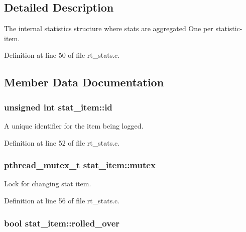 \subsection{Detailed Description}
The internal statistics structure where stats are aggregated One per statistic-\/item. 

Definition at line 50 of file rt\-\_\-stats.\-c.



\subsection{Member Data Documentation}
\hypertarget{structstat__item_a8f48ef423c6bb652d59e567f3585f6bd}{
\subsubsection[{id}]{\setlength{\rightskip}{0pt plus 5cm}unsigned int stat\-\_\-item\-::id}}\label{structstat__item_a8f48ef423c6bb652d59e567f3585f6bd}


A unique identifier for the item being logged. 



Definition at line 52 of file rt\-\_\-stats.\-c.

\hypertarget{structstat__item_a5dc6d221657bec60e0613ef64ea6ee28}{
\subsubsection[{mutex}]{\setlength{\rightskip}{0pt plus 5cm}pthread\-\_\-mutex\-\_\-t stat\-\_\-item\-::mutex}}\label{structstat__item_a5dc6d221657bec60e0613ef64ea6ee28}


Lock for changing stat item. 



Definition at line 56 of file rt\-\_\-stats.\-c.

\hypertarget{structstat__item_ac8339e9dc15d83bd0e8a4de598427b56}{
\subsubsection[{rolled\-\_\-over}]{\setlength{\rightskip}{0pt plus 5cm}bool stat\-\_\-item\-::rolled\-\_\-over}}\label{structstat__item_ac8339e9dc15d83bd0e8a4de598427b56}


